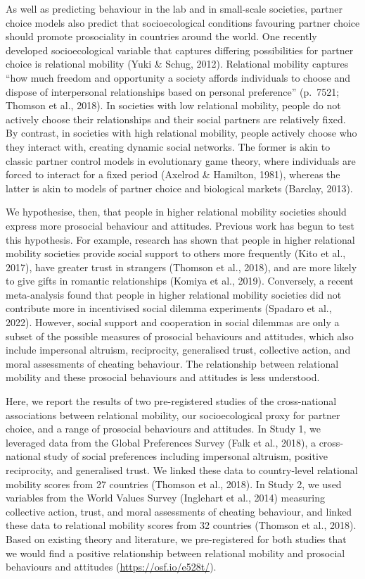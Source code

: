 \documentclass[english,man,floatsintext]{apa6}
\begin{document}
As well as predicting behaviour in the lab and in small-scale societies, partner choice models also predict that socioecological conditions favouring partner choice should promote prosociality in countries around the world. One recently developed socioecological variable that captures differing possibilities for partner choice is relational mobility (Yuki \& Schug, 2012). Relational mobility captures \enquote{how much freedom and opportunity a society affords individuals to choose and dispose of interpersonal relationships based on personal preference} (p.~7521; Thomson et al., 2018). In societies with low relational mobility, people do not actively choose their relationships and their social partners are relatively fixed. By contrast, in societies with high relational mobility, people actively choose who they interact with, creating dynamic social networks. The former is akin to classic partner control models in evolutionary game theory, where individuals are forced to interact for a fixed period (Axelrod \& Hamilton, 1981), whereas the latter is akin to models of partner choice and biological markets (Barclay, 2013).

We hypothesise, then, that people in higher relational mobility societies should express more prosocial behaviour and attitudes. Previous work has begun to test this hypothesis. For example, research has shown that people in higher relational mobility societies provide social support to others more frequently (Kito et al., 2017), have greater trust in strangers (Thomson et al., 2018), and are more likely to give gifts in romantic relationships (Komiya et al., 2019). Conversely, a recent meta-analysis found that people in higher relational mobility societies did not contribute more in incentivised social dilemma experiments (Spadaro et al., 2022). However, social support and cooperation in social dilemmas are only a subset of the possible measures of prosocial behaviours and attitudes, which also include impersonal altruism, reciprocity, generalised trust, collective action, and moral assessments of cheating behaviour. The relationship between relational mobility and these prosocial behaviours and attitudes is less understood.

Here, we report the results of two pre-registered studies of the cross-national associations between relational mobility, our socioecological proxy for partner choice, and a range of prosocial behaviours and attitudes. In Study 1, we leveraged data from the Global Preferences Survey (Falk et al., 2018), a cross-national study of social preferences including impersonal altruism, positive reciprocity, and generalised trust. We linked these data to country-level relational mobility scores from 27 countries (Thomson et al., 2018). In Study 2, we used variables from the World Values Survey (Inglehart et al., 2014) measuring collective action, trust, and moral assessments of cheating behaviour, and linked these data to relational mobility scores from 32 countries (Thomson et al., 2018). Based on existing theory and literature, we pre-registered for both studies that we would find a positive relationship between relational mobility and prosocial behaviours and attitudes (\url{https://osf.io/e528t/}).
\end{document}
